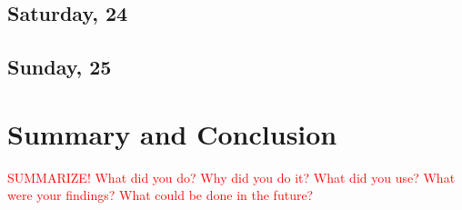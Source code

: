 \section{Saturday, \SI{24}{\dec}}
\section{Sunday, \SI{25}{\dec}}

% 
% 

% 


\chapter{Summary and Conclusion}
\textcolor{red}{SUMMARIZE! What did you do? Why did you do it? What did you use? What were your findings? What could be done in the future?}

